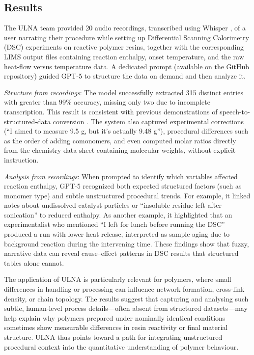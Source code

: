 \subsection*{Results}
The ULNA team provided 20 audio recordings, transcribed using Whisper \cite{radford2023robust}, of a user narrating their procedure while setting up Differential Scanning Calorimetry (DSC) experiments on reactive polymer resins, together with the corresponding LIMS output files containing reaction enthalpy, onset temperature, and the raw heat-flow versus temperature data. A dedicated prompt (available on the GitHub repository) guided GPT-5 to structure the data on demand and then analyze it.

\textit{Structure from recordings}: The model successfully extracted 315 distinct entries with greater than 99\% accuracy, missing only two due to incomplete transcription. This result is consistent with previous demonstrations of speech-to-structured-data conversion \cite{zimmermann202534}. The system also captured experimental corrections (“I aimed to measure 9.5 g, but it’s actually 9.48 g”), procedural differences such as the order of adding comonomers, and even computed molar ratios directly from the chemistry data sheet containing molecular weights, without explicit instruction.

\textit{Analysis from recordings}: When prompted to identify which variables affected reaction enthalpy, GPT-5 recognized both expected structured factors (such as monomer type) and subtle unstructured procedural trends. For example, it linked notes about undissolved catalyst particles or “insoluble residue left after sonication” to reduced enthalpy. As another example, it highlighted that an experimentalist who mentioned “I left for lunch before running the DSC” produced a run with lower heat release, interpreted as sample aging due to background reaction during the intervening time. These findings show that fuzzy, narrative data can reveal cause–effect patterns in DSC results that structured tables alone cannot.

The application of ULNA is particularly relevant for polymers, where small differences in handling or processing can influence network formation, cross-link density, or chain topology. The results suggest that capturing and analysing such subtle, human-level process details—often absent from structured datasets—may help explain why polymers prepared under nominally identical conditions sometimes show measurable differences in resin reactivity or final material structure. ULNA thus points toward a path for integrating unstructured procedural context into the quantitative understanding of polymer behaviour.

